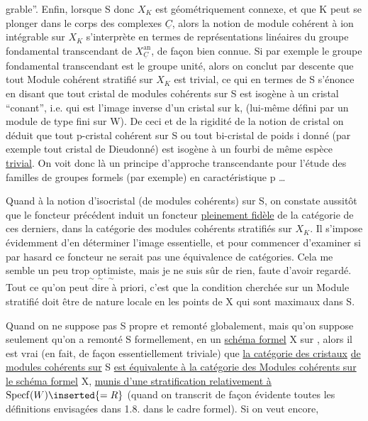 
grable''. \inserted{[}Enfin, lorsque S donc $X_K$ est géométriquement connexe, et que K peut se plonger dans le corps des complexes $\underline C$, alors la notion de module cohérent à ion intégrable sur $X_K$ s'interprète en termes de représentations linéaires  du groupe fondamental  transcendant de $X_{\underline C}^{\mathrm{an}}$, de façon bien connue. Si par exemple le groupe fondamental transcendant est le groupe unité, alors on conclut par descente que tout Module cohérent stratifié sur $X_K$ est trivial, ce qui en termes de S s'énonce en disant que tout cristal de modules cohérents sur S est isogène à un cristal ``conant'', i.e.   qui est l'image inverse d'un cristal sur k, (lui-même défini par un module de type fini sur W). De ceci et de la rigidité de la notion de cristal on déduit que tout p-cristal cohérent sur S ou tout bi-cristal de poids i donné (par exemple tout cristal de Dieudonné)  est isogène à un fourbi de même espèce \uline{trivial}. On voit donc là un principe d'approche transcendante pour l'étude des familles de groupes formels (par exemple) en caractéristique p \ldots\inserted{]}

Quand à la notion d'isocristal (de modules cohérents) sur S, on constate aussitôt que le foncteur précédent induit un foncteur \uline{pleinement fidèle} de la catégorie de ces derniers, dans la catégorie des modules cohérents stratifiés sur $X_K$. Il s'impose évidemment d'en déterminer l'image essentielle, et pour commencer d'examiner  si par hasard ce foncteur ne serait pas une équivalence de catégories. \deleted{\unsure{(}}Cela me semble un peu $\underset{\sim\ \sim\ \sim}{\text{trop optimiste}}$, mais je ne suis sûr de rien, faute d'avoir regardé.
Tout ce qu'on peut dire à priori, c'est que la condition cherchée sur un Module stratifié doit être de nature locale en les points de X qui sont maximaux dans S.

Quand on ne suppose pas S  propre et remonté globalement, mais qu'on suppose seulement qu'on a remonté S formellement, en un \uline{schéma formel} X sur , alors il est vrai (en fait, de façon essentiellement triviale) que \uline{la catégorie des cristaux}  \uline{de modules cohérents sur} S \uline{est équivalente à la catégorie des Modules cohérents sur le schéma formel} X, \uline{munis d'une stratification relativement à} $\operatorname{Specf}(W)\inserted{=R}$ (quand on transcrit de façon évidente toutes les définitions envisagées dans 1.8. dans le cadre formel). Si on veut encore,
